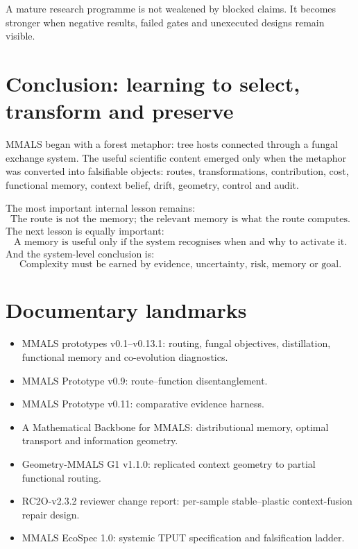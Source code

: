 \documentclass[11pt,a4paper]{article}
\begin{document}
\begin{researchbox}
A mature research programme is not weakened by blocked claims. It becomes stronger when negative results, failed gates and unexecuted designs remain visible.
\end{researchbox}

\section{Conclusion: learning to select, transform and preserve}

MMALS began with a forest metaphor: tree hosts connected through a fungal exchange system. The useful scientific content emerged only when the metaphor was converted into falsifiable objects: routes, transformations, contribution, cost, functional memory, context belief, drift, geometry, control and audit.

The most important internal lesson remains:
\[
\boxed{\text{The route is not the memory; the relevant memory is what the route computes.}}
\]
The next lesson is equally important:
\[
\boxed{\text{A memory is useful only if the system recognises when and why to activate it.}}
\]
And the system-level conclusion is:
\[
\boxed{\text{Complexity must be earned by evidence, uncertainty, risk, memory or goal.}}
\]

\section*{Documentary landmarks}

\begin{itemize}[leftmargin=1.4em]
\item MMALS prototypes v0.1--v0.13.1: routing, fungal objectives, distillation, functional memory and co-evolution diagnostics.
\item MMALS Prototype v0.9: route--function disentanglement.
\item MMALS Prototype v0.11: comparative evidence harness.
\item A Mathematical Backbone for MMALS: distributional memory, optimal transport and information geometry.
\item Geometry-MMALS G1 v1.1.0: replicated context geometry to partial functional routing.
\item RC2O-v2.3.2 reviewer change report: per-sample stable--plastic context-fusion repair design.
\item MMALS EcoSpec 1.0: systemic TPUT specification and falsification ladder.
\end{itemize}
\end{document}
